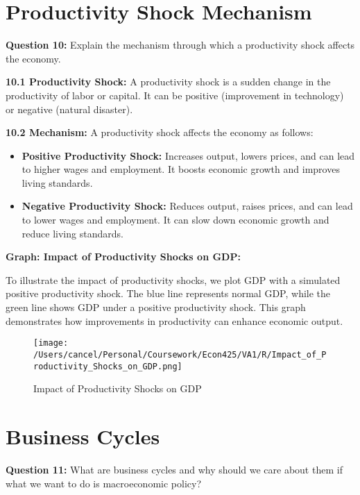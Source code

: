 \documentclass{article}
\begin{document}
\hrulefill

\section{Productivity Shock Mechanism}

\textbf{Question 10:} Explain the mechanism through which a productivity shock affects the economy.

\textbf{10.1 Productivity Shock:} A productivity shock is a sudden change in the productivity of labor or capital. It can be positive (improvement in technology) or negative (natural disaster).

\textbf{10.2 Mechanism:} A productivity shock affects the economy as follows:

\begin{itemize}
    \item \textbf{Positive Productivity Shock:} Increases output, lowers prices, and can lead to higher wages and employment. It boosts economic growth and improves living standards.
    \item \textbf{Negative Productivity Shock:} Reduces output, raises prices, and can lead to lower wages and employment. It can slow down economic growth and reduce living standards.
\end{itemize}

\textbf{Graph: Impact of Productivity Shocks on GDP:} 

To illustrate the impact of productivity shocks, we plot GDP with a simulated positive productivity shock. The blue line represents normal GDP, while the green line shows GDP under a positive productivity shock. This graph demonstrates how improvements in productivity can enhance economic output.

\begin{figure}[h!]
    \centering
    \texttt{[image: /Users/cancel/Personal/Coursework/Econ425/VA1/R/Impact\_of\_Productivity\_Shocks\_on\_GDP.png]}
    \caption{Impact of Productivity Shocks on GDP}
\end{figure}

\hrulefill

\section{Business Cycles}

\textbf{Question 11:} What are business cycles and why should we care about them if what we want to do is macroeconomic policy?
\end{document}
